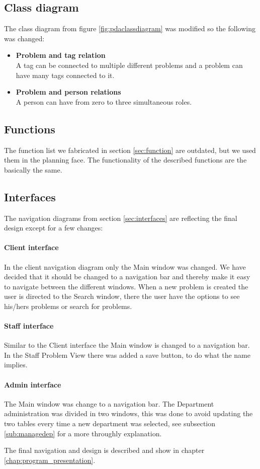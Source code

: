 \subsection{Class diagram}
\label{sub:classdiagram}
The class diagram from figure \ref{fig:pdaclassdiagram} was modified so the following was changed:
\begin{itemize}
\item \textbf{Problem and tag relation} \\
					A tag can be connected to multiple different problems and a problem can have many tags connected to it. 
\item \textbf{Problem and person relations} \\
					A person can have from zero to three simultaneous roles.	
\end{itemize}

\subsection{Functions}
\label{sub:function}
The function list we fabricated in section \ref{sec:function} are outdated, but we used them in the planning face. The functionality of the described functions are the basically the same.  

\subsection{Interfaces}
\label{sub:interface}
The navigation diagrams from section \ref{sec:interfaces} are reflecting the final design except for a few changes:

\paragraph{Client interface}
In the client navigation diagram only the Main window was changed. We have decided that it should be changed to a navigation bar and thereby make it easy to navigate between the different windows. 
When a new problem is created the user is directed to the Search window, there the user have the options to see his/hers problems or search for problems. 

\paragraph{Staff interface}
Similar to the Client interface the Main window is changed to a navigation bar. In the Staff Problem View there was added a save button, to do what the name implies. 

\paragraph{Admin interface}
The Main window was change to a navigation bar. The Department administration was divided in two windows, this was done to avoid updating the two tables every time a new department was selected, see subsection \ref{sub:managedep} for a more throughly explanation.  

The final navigation and design is described and show in chapter \ref{chap:program_presentation}.

